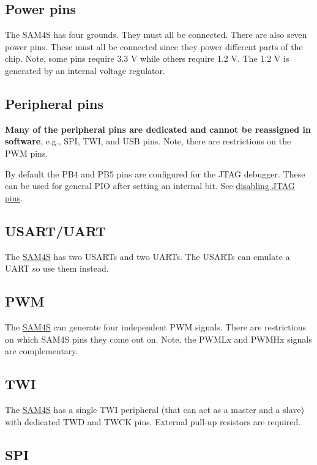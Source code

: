 \subsection{Power pins}\label{power-pins}

The SAM4S has four grounds. They must all be connected. There are also
seven power pins. These must all be connected since they power different
parts of the chip. Note, some pins require 3.3 V while others require
1.2 V. The 1.2 V is generated by an internal voltage regulator.

\subsection{Peripheral pins}\label{peripheral-pins}

\textbf{Many of the peripheral pins are dedicated and cannot be
reassigned in software}, e.g., SPI, TWI, and USB pins. Note, there are
restrictions on the PWM pins.

By default the PB4 and PB5 pins are configured for the JTAG debugger.
These can be used for general PIO after setting an internal bit.  See
\protect\hyperref[disabling-jtag-pins]{disabling JTAG pins}.

\subsection{USART/UART}\label{usartuart}

The \url{SAM4S} has two USARTs and two UARTs. The USARTs can emulate a
UART so use them instead.

\subsection{PWM}\label{pwm}

The \url{SAM4S} can generate four independent PWM signals. There are
restrictions on which SAM4S pins they come out on. Note, the PWMLx and
PWMHx signals are complementary.

\subsection{TWI}\label{twi}

The \url{SAM4S} has a single TWI peripheral (that can act as a master
and a slave) with dedicated TWD and TWCK pins. External pull-up
resistors are required.

\subsection{SPI}\label{spi}

